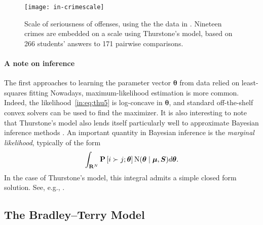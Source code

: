 \begin{figure}[ht]
\centering
\texttt{[image: in-crimescale]}
\caption{
Scale of seriousness of offenses, using the the data in \citet{thurstone1927method}.
Nineteen crimes are embedded on a scale using Thurstone's model, based on 266 students' answers to 171 pairwise comparisons.
}
\label{in:fig:crimescale}
\end{figure}


\paragraph{A note on inference}
The first approaches to learning the parameter vector $\bm{\theta}$ from data relied on least-squares fitting \citep{thurstone1927method, mosteller1951remarks}
Nowadays, maximum-likelihood estimation is more common.
Indeed, the likelihood~\eqref{in:eq:thu5} is log-concave in $\bm{\theta}$, and standard off-the-shelf convex solvers can be used to find the maximizer.
It is also interesting to note that Thurstone's model also lends itself particularly well to approximate Bayesian inference methods \citep{chu2005extensions, chu2005preference}.
An important quantity in Bayesian inference is the \emph{marginal likelihood}, typically of the form
\begin{align*}
\int_{\mathbf{R}^N} \mathbf{P}\left[ i \succ j ; \bm{\theta} \right] \mathrm{N}( \bm{\theta} \mid \bm{\mu}, \bm{S} ) d\bm{\theta}.
\end{align*}
In the case of Thurstone's model, this integral admits a simple closed form solution. See, e.g., \citet[Section~3.9]{rasmussen2006gaussian}.


\subsection{The Bradley--Terry Model}

